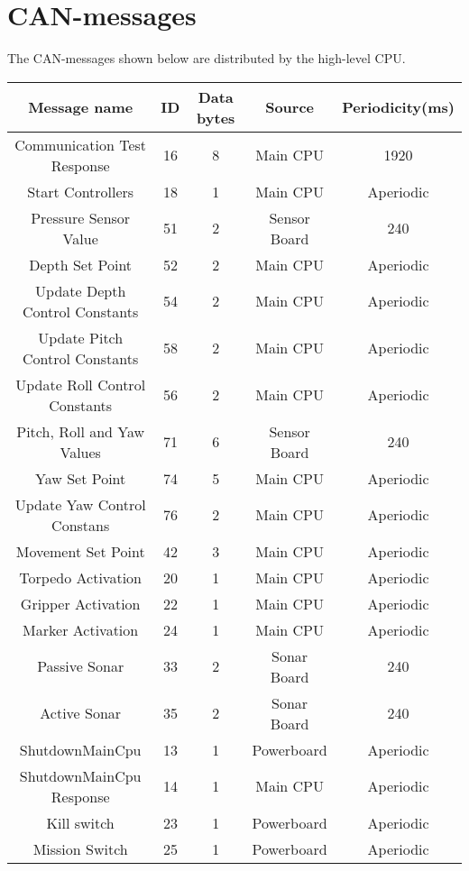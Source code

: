 \section{ CAN-messages}
The CAN-messages shown below are distributed by the high-level CPU.
\begin{center}
    \begin{tabular}{|c|c|c|c|c|}
    \hline
    \textbf{Message name} & \textbf{ID}    & \textbf{Data bytes} & \textbf{Source} & \textbf{Periodicity(ms)} \\ \hline
    Communication Test Response & 16    & 8     & Main CPU & 1920 \\ \hline
    Start Controllers & 18    & 1     & Main CPU & Aperiodic \\ \hline
    Pressure Sensor Value & 51    & 2     & Sensor Board & 240 \\ \hline
    Depth Set Point & 52    & 2     & Main CPU & Aperiodic \\ \hline
    Update Depth Control Constants & 54    & 2     & Main CPU & Aperiodic \\ \hline
    Update Pitch Control Constants & 58    & 2     & Main CPU & Aperiodic \\ \hline
    Update Roll Control Constants & 56    & 2     & Main CPU & Aperiodic \\ \hline
    Pitch, Roll and Yaw Values & 71    & 6     & Sensor Board & 240 \\ \hline
    Yaw Set Point & 74    & 5     & Main CPU & Aperiodic \\ \hline
    Update Yaw Control Constans & 76    & 2     & Main CPU & Aperiodic \\ \hline
    Movement Set Point & 42    & 3     & Main CPU & Aperiodic \\ \hline
    Torpedo Activation & 20    & 1     & Main CPU & Aperiodic \\ \hline
    Gripper Activation & 22    & 1     & Main CPU & Aperiodic \\ \hline
    Marker Activation & 24    & 1     & Main CPU & Aperiodic \\ \hline
    Passive Sonar & 33    & 2     & Sonar Board & 240 \\ \hline
    Active Sonar & 35    & 2     & Sonar Board & 240 \\ \hline
    ShutdownMainCpu & 13    & 1     & Powerboard & Aperiodic \\ \hline
    ShutdownMainCpu Response & 14    & 1     & Main CPU & Aperiodic \\ \hline
    Kill switch & 23    & 1     & Powerboard & Aperiodic \\ \hline
    Mission Switch & 25    & 1     & Powerboard & Aperiodic \\ \hline
    \end{tabular}
\end{center}

